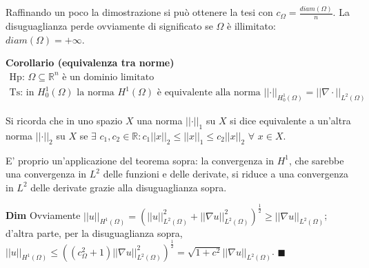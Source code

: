 \documentclass{article}
\begin{document}
Raffinando un poco la dimostrazione si pu\`{o} ottenere la tesi con $%
c_{\Omega }=\frac{diam\left( \Omega \right) }{n}$. La disuguaglianza perde
ovviamente di significato se $\Omega $ \`{e} illimitato: $diam\left( \Omega
\right) =+\infty $.

\textbf{Corollario (equivalenza tra norme)}%
\begin{gather*}
\text{Hp}\text{: }\Omega \subseteq 
\mathbb{R}
^{n}\text{ \`{e} un dominio limitato} \\
\text{Ts}\text{: in }H_{0}^{1}\left( \Omega \right) \text{ la norma }%
H^{1}\left( \Omega \right) \text{ \`{e} equivalente alla norma }\left\vert
\left\vert \cdot \right\vert \right\vert _{H_{0}^{1}\left( \Omega \right)
}=\left\vert \left\vert \nabla \cdot \right\vert \right\vert _{L^{2}\left(
\Omega \right) }
\end{gather*}

Si ricorda che in uno spazio $X$ una norma $\left\vert \left\vert \cdot
\right\vert \right\vert _{1}$ su $X$ si dice equivalente a un'altra norma $%
\left\vert \left\vert \cdot \right\vert \right\vert _{2}$ su $X$ se $\exists 
$ $c_{1},c_{2}\in 
\mathbb{R}
:c_{1}\left\vert \left\vert x\right\vert \right\vert _{2}\leq \left\vert
\left\vert x\right\vert \right\vert _{1}\leq c_{2}\left\vert \left\vert
x\right\vert \right\vert _{2}$ $\forall $ $x\in X$.

E' proprio un'applicazione del teorema sopra: la convergenza in $H^{1}$, che
sarebbe una convergenza in $L^{2}$ delle funzioni e delle derivate, si
riduce a una convergenza in $L^{2}$ delle derivate grazie alla
disuguaglianza sopra.

\textbf{Dim} Ovviamente $\left\vert \left\vert u\right\vert \right\vert
_{H^{1}\left( \Omega \right) }=\left( \left\vert \left\vert u\right\vert
\right\vert _{L^{2}\left( \Omega \right) }^{2}+\left\vert \left\vert \nabla
u\right\vert \right\vert _{L^{2}\left( \Omega \right) }^{2}\right) ^{\frac{1%
}{2}}\geq \left\vert \left\vert \nabla u\right\vert \right\vert
_{L^{2}\left( \Omega \right) }$; d'altra parte, per la disuguaglianza sopra, 
$\left\vert \left\vert u\right\vert \right\vert _{H^{1}\left( \Omega \right)
}\leq \left( \left( c_{\Omega }^{2}+1\right) \left\vert \left\vert \nabla
u\right\vert \right\vert _{L^{2}\left( \Omega \right) }^{2}\right) ^{\frac{1%
}{2}}=\sqrt{1+c^{2}}\left\vert \left\vert \nabla u\right\vert \right\vert
_{L^{2}\left( \Omega \right) }$. $\blacksquare $
\end{document}
